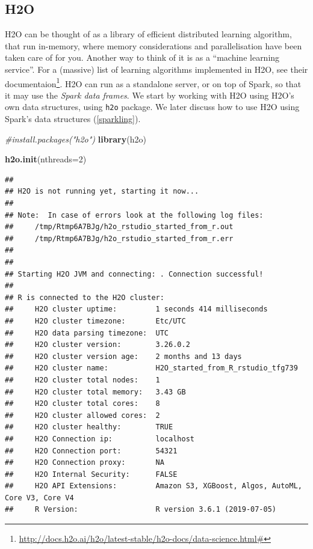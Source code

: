 \documentclass[]{book}
\newenvironment{Shaded}{\begin{snugshade}}{\end{snugshade}}
\newcommand{\CommentTok}[1]{\textcolor[rgb]{0.56,0.35,0.01}{\textit{#1}}}
\newcommand{\DataTypeTok}[1]{\textcolor[rgb]{0.13,0.29,0.53}{#1}}
\newcommand{\DecValTok}[1]{\textcolor[rgb]{0.00,0.00,0.81}{#1}}
\newcommand{\KeywordTok}[1]{\textcolor[rgb]{0.13,0.29,0.53}{\textbf{#1}}}
\newcommand{\NormalTok}[1]{#1}
\renewcommand{\href}[2]{#2\footnote{\url{#1}}}
\theoremstyle{definition}
\theoremstyle{definition}
\theoremstyle{definition}
\theoremstyle{remark}
\begin{document}
\hypertarget{h2o}{%
\subsection{H2O}\label{h2o}}

H2O can be thought of as a library of efficient distributed learning algorithm, that run in-memory, where memory considerations and parallelisation have been taken care of for you.
Another way to think of it is as a ``machine learning service''.
For a (massive) list of learning algorithms implemented in H2O, see \href{http://docs.h2o.ai/h2o/latest-stable/h2o-docs/data-science.html\#}{their documentaion}.
H2O can run as a standalone server, or on top of Spark, so that it may use the \emph{Spark data frames}.
We start by working with H2O using H2O's own data structures, using \texttt{h2o} package.
We later discuss how to use H2O using Spark's data structures (\ref{sparkling}).

\begin{Shaded}
\begin{Highlighting}[]
\CommentTok{#install.packages("h2o") }
\KeywordTok{library}\NormalTok{(h2o)}

\KeywordTok{h2o.init}\NormalTok{(}\DataTypeTok{nthreads=}\DecValTok{2}\NormalTok{) }
\end{Highlighting}
\end{Shaded}

\begin{verbatim}
## 
## H2O is not running yet, starting it now...
## 
## Note:  In case of errors look at the following log files:
##     /tmp/Rtmp6A7BJg/h2o_rstudio_started_from_r.out
##     /tmp/Rtmp6A7BJg/h2o_rstudio_started_from_r.err
## 
## 
## Starting H2O JVM and connecting: . Connection successful!
## 
## R is connected to the H2O cluster: 
##     H2O cluster uptime:         1 seconds 414 milliseconds 
##     H2O cluster timezone:       Etc/UTC 
##     H2O data parsing timezone:  UTC 
##     H2O cluster version:        3.26.0.2 
##     H2O cluster version age:    2 months and 13 days  
##     H2O cluster name:           H2O_started_from_R_rstudio_tfg739 
##     H2O cluster total nodes:    1 
##     H2O cluster total memory:   3.43 GB 
##     H2O cluster total cores:    8 
##     H2O cluster allowed cores:  2 
##     H2O cluster healthy:        TRUE 
##     H2O Connection ip:          localhost 
##     H2O Connection port:        54321 
##     H2O Connection proxy:       NA 
##     H2O Internal Security:      FALSE 
##     H2O API Extensions:         Amazon S3, XGBoost, Algos, AutoML, Core V3, Core V4 
##     R Version:                  R version 3.6.1 (2019-07-05)
\end{verbatim}
\end{document}
